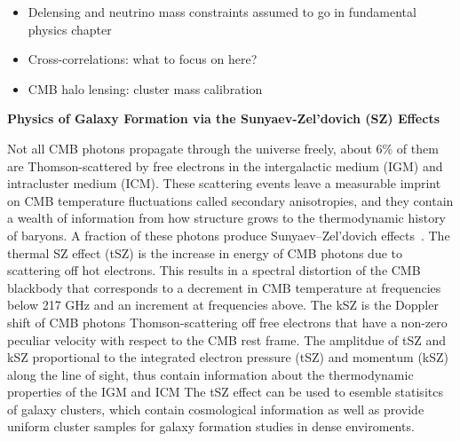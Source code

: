 \documentclass[PICOReport.tex]{subfiles}
\begin{document}
\begin{itemize}
\item Delensing and neutrino mass constraints assumed to go in fundamental physics chapter
\item Cross-correlations: what to focus on here?
\item CMB halo lensing: cluster mass calibration
\end{itemize}

{\bf Physics of Galaxy Formation via the Sunyaev-Zel'dovich (SZ) Effects}

Not all CMB photons propagate through the universe freely, about 6\% of them are Thomson-scattered by free electrons in the intergalactic medium (IGM) and intracluster medium (ICM). These scattering events leave a measurable imprint on CMB temperature fluctuations called secondary anisotropies, and they contain a wealth of information from how structure grows to the thermodynamic history of baryons. A fraction of these photons produce Sunyaev--Zel'dovich effects~\citep{SZ1969,SZ1972}. The thermal SZ effect (tSZ) is the increase in energy of CMB photons due to scattering off hot electrons. This results in a spectral distortion
 of the CMB blackbody that corresponds to a decrement in CMB temperature at frequencies below 217 GHz and an increment at frequencies above. The kSZ is the Doppler shift of CMB photons Thomson-scattering off free electrons that have a non-zero peculiar velocity with respect to the CMB rest frame. 
The amplitdue of tSZ and kSZ proportional to the integrated electron pressure (tSZ) and momentum (kSZ) along the line of sight, thus contain information about the thermodynamic properties of the IGM and ICM 
The tSZ effect can be used to esemble statisitcs of galaxy clusters, which contain cosmological information as well as provide uniform cluster samples for galaxy formation studies in dense enviroments.
%
\end{document}
